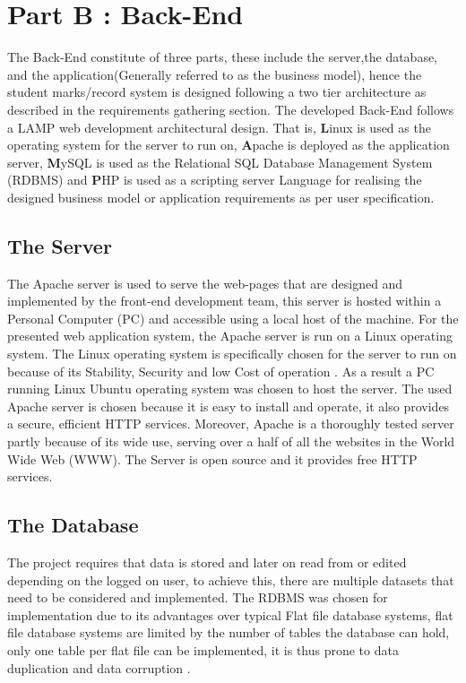 

\section{Part B : Back-End}  
The Back-End constitute of three parts, these include the server,the database, and the application(Generally referred to as the business model), hence the  student marks/record system is designed following a two tier architecture as described in the requirements gathering section. The developed Back-End follows a LAMP web development architectural design. That is, \textbf{L}inux is used as the operating system for the server to run on, \textbf{A}pache is deployed as the application server, \textbf{M}ySQL is used as the Relational SQL Database Management System (RDBMS) and \textbf{P}HP is used as a scripting server Language for realising the designed business model or application requirements as per user specification.     

\subsection{The Server}
The Apache server is used to serve the web-pages that are designed and implemented by the front-end development team, this server is hosted within a Personal Computer (PC) and accessible using a local host of the machine. For the presented web application system, the Apache server is run on a Linux operating system. The Linux operating system is specifically chosen for the server to run on because of its Stability, Security and low Cost of operation \cite{ref1}. As a result a PC running Linux Ubuntu operating system was chosen to host the server. The used Apache server is chosen because it is easy to install and operate, it also provides a secure, efficient HTTP services. Moreover, Apache is a thoroughly tested server partly because of its wide use, serving over a half of all the websites in the World Wide Web (WWW). The Server is open source and it provides free HTTP services.  

\subsection{The Database} 

The project requires that data is stored and later on read from or edited depending on the logged on user, to achieve this, there are multiple datasets that need to be considered and implemented. 
The RDBMS was chosen for implementation due to its advantages over typical Flat file database systems, flat file database systems are limited by the number of tables the database can hold, only one table per flat file can be implemented, it is thus prone to data duplication and data corruption \cite{ref10, ref11}. 

